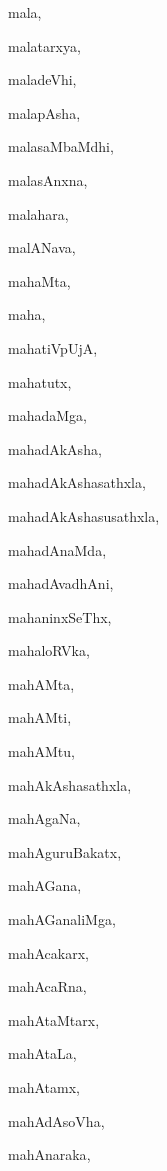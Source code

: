 \begin{multicols}{2}
{mala}, \pageref{mala}

{malatarxya}, \pageref{malatarxya}

{maladeVhi}, \pageref{maladeVhi}

{malapAsha}, \pageref{malapAsha}

{malasaMbaMdhi}, \pageref{malasaMbaMdhi}

{malasAnxna}, \pageref{malasAnxna}

{malahara}, \pageref{malahara}

{malANava}, \pageref{malANava}

{mahaMta}, \pageref{mahaMta}

{maha}, \pageref{maha}

{mahatiVpUjA}, \pageref{mahatiVpUjA}

{mahatutx}, \pageref{mahatutx}

{mahadaMga}, \pageref{mahadaMga}

{mahadAkAsha}, \pageref{mahadAkAsha}

{mahadAkAshasathxla}, \pageref{mahadAkAshasathxla}

{mahadAkAshasusathxla}, \pageref{mahadAkAshasusathxla}

{mahadAnaMda}, \pageref{mahadAnaMda}

{mahadAvadhAni}, \pageref{mahadAvadhAni}

{mahaninxSeThx}, \pageref{mahaninxSeThx}

{mahaloRVka}, \pageref{mahaloRVka}

{mahAMta}, \pageref{mahAMta}

{mahAMti}, \pageref{mahAMti}

{mahAMtu}, \pageref{mahAMtu}

{mahAkAshasathxla}, \pageref{mahAkAshasathxla}

{mahAgaNa}, \pageref{mahAgaNa}

{mahAguruBakatx}, \pageref{mahAguruBakatx}

{mahAGana}, \pageref{mahAGana}

{mahAGanaliMga}, \pageref{mahAGanaliMga}

{mahAcakarx}, \pageref{mahAcakarx}

{mahAcaRna}, \pageref{mahAcaRna}

{mahAtaMtarx}, \pageref{mahAtaMtarx}

{mahAtaLa}, \pageref{mahAtaLa}

{mahAtamx}, \pageref{mahAtamx}

{mahAdAsoVha}, \pageref{mahAdAsoVha}

{mahAnaraka}, \pageref{mahAnaraka}


\end{multicols}
